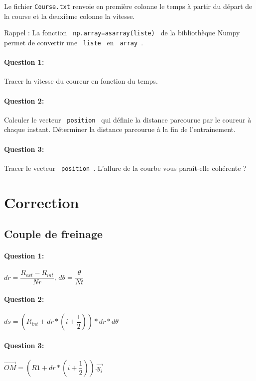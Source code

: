 Le fichier \texttt{Course.txt} renvoie en première colonne le temps à partir du départ de la course et la deuxième colonne la vitesse.

Rappel : La fonction \verb? np.array=asarray(liste) ? de la bibliothèque Numpy permet de convertir une \verb? liste ? en \verb? array ?.

\paragraph{Question 1:} Tracer la vitesse du coureur en fonction du temps. 

\paragraph{Question 2:} Calculer le vecteur \verb? position ? qui définie la distance parcourue par le coureur à chaque instant. Déterminer la distance parcourue à la fin de l'entrainement.

\paragraph{Question 3:} Tracer le vecteur \verb? position ?. L'allure de la courbe vous paraît-elle cohérente ?

\ifdef{\public}{}{}

\newpage

\pagestyle{correction}

\section{Correction}

\subsection{Couple de freinage}

\paragraph{Question 1:} $dr=\dfrac{R_{ext}-R_{int}}{Nr}$, $d\theta=\dfrac{\theta}{Nt}$

\paragraph{Question 2:} $ds=(R_{int}+dr*(i+\dfrac{1}{2}))*dr*d\theta$ 

\paragraph{Question 3:} $\overrightarrow{OM}=(R1+dr*(i+\dfrac{1}{2})).\overrightarrow{y_i}$

